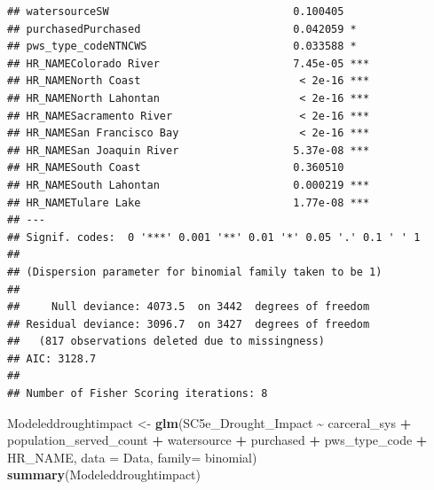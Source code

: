 \documentclass[
]{article}
\newenvironment{Shaded}{\begin{snugshade}}{\end{snugshade}}
\newcommand{\AttributeTok}[1]{\textcolor[rgb]{0.13,0.29,0.53}{#1}}
\newcommand{\FunctionTok}[1]{\textcolor[rgb]{0.13,0.29,0.53}{\textbf{#1}}}
\newcommand{\NormalTok}[1]{#1}
\newcommand{\OtherTok}[1]{\textcolor[rgb]{0.56,0.35,0.01}{#1}}
\newcommand{\SpecialCharTok}[1]{\textcolor[rgb]{0.81,0.36,0.00}{\textbf{#1}}}
\begin{document}
\begin{verbatim}
## watersourceSW                             0.100405    
## purchasedPurchased                        0.042059 *  
## pws_type_codeNTNCWS                       0.033588 *  
## HR_NAMEColorado River                     7.45e-05 ***
## HR_NAMENorth Coast                         < 2e-16 ***
## HR_NAMENorth Lahontan                      < 2e-16 ***
## HR_NAMESacramento River                    < 2e-16 ***
## HR_NAMESan Francisco Bay                   < 2e-16 ***
## HR_NAMESan Joaquin River                  5.37e-08 ***
## HR_NAMESouth Coast                        0.360510    
## HR_NAMESouth Lahontan                     0.000219 ***
## HR_NAMETulare Lake                        1.77e-08 ***
## ---
## Signif. codes:  0 '***' 0.001 '**' 0.01 '*' 0.05 '.' 0.1 ' ' 1
## 
## (Dispersion parameter for binomial family taken to be 1)
## 
##     Null deviance: 4073.5  on 3442  degrees of freedom
## Residual deviance: 3096.7  on 3427  degrees of freedom
##   (817 observations deleted due to missingness)
## AIC: 3128.7
## 
## Number of Fisher Scoring iterations: 8
\end{verbatim}

\begin{Shaded}
\begin{Highlighting}[]
\NormalTok{Modeleddroughtimpact }\OtherTok{\textless{}{-}} \FunctionTok{glm}\NormalTok{(SC5e\_Drought\_Impact }\SpecialCharTok{\textasciitilde{}}\NormalTok{ carceral\_sys }\SpecialCharTok{+}\NormalTok{ population\_served\_count }\SpecialCharTok{+}\NormalTok{ watersource }\SpecialCharTok{+}\NormalTok{ purchased }\SpecialCharTok{+}\NormalTok{ pws\_type\_code }\SpecialCharTok{+}\NormalTok{ HR\_NAME, }\AttributeTok{data =}\NormalTok{ Data, }\AttributeTok{family=}\NormalTok{ binomial)}
\FunctionTok{summary}\NormalTok{(Modeleddroughtimpact)}
\end{Highlighting}
\end{Shaded}
\end{document}
